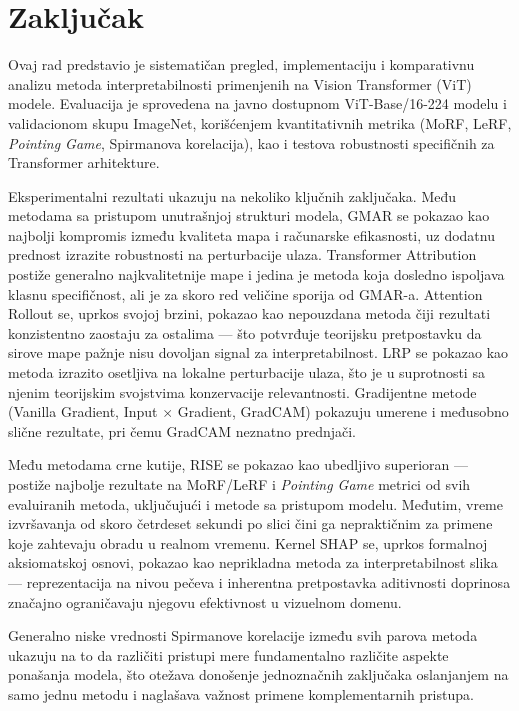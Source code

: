 \section{Zaključak}

Ovaj rad predstavio je sistematičan pregled, implementaciju i komparativnu analizu metoda interpretabilnosti primenjenih na Vision Transformer (ViT) modele. Evaluacija je sprovedena na javno dostupnom ViT-Base/16-224 modelu i validacionom skupu ImageNet, korišćenjem kvantitativnih metrika (MoRF, LeRF, \textit{Pointing Game}, Spirmanova korelacija), kao i testova robustnosti specifičnih za Transformer arhitekture.

Eksperimentalni rezultati ukazuju na nekoliko ključnih zaključaka. Među metodama sa pristupom unutrašnjoj strukturi modela, GMAR se pokazao kao najbolji kompromis između kvaliteta mapa i računarske efikasnosti, uz dodatnu prednost izrazite robustnosti na perturbacije ulaza. Transformer Attribution postiže generalno najkvalitetnije mape i jedina je metoda koja dosledno ispoljava klasnu specifičnost, ali je za skoro red veličine sporija od GMAR-a. Attention Rollout se, uprkos svojoj brzini, pokazao kao nepouzdana metoda čiji rezultati konzistentno zaostaju za ostalima — što potvrđuje teorijsku pretpostavku da sirove mape pažnje nisu dovoljan signal za interpretabilnost. LRP se pokazao kao metoda izrazito osetljiva na lokalne perturbacije ulaza, što je u suprotnosti sa njenim teorijskim svojstvima konzervacije relevantnosti. Gradijentne metode (Vanilla Gradient, Input $\times$ Gradient, GradCAM) pokazuju umerene i međusobno slične rezultate, pri čemu GradCAM neznatno prednjači.

Među metodama crne kutije, RISE se pokazao kao ubedljivo superioran — postiže najbolje rezultate na MoRF/LeRF i \textit{Pointing Game} metrici od svih evaluiranih metoda, uključujući i metode sa pristupom modelu. Međutim, vreme izvršavanja od skoro četrdeset sekundi po slici čini ga nepraktičnim za primene koje zahtevaju obradu u realnom vremenu. Kernel SHAP se, uprkos formalnoj aksiomatskoj osnovi, pokazao kao neprikladna metoda za interpretabilnost slika — reprezentacija na nivou pečeva i inherentna pretpostavka aditivnosti doprinosa značajno ograničavaju njegovu efektivnost u vizuelnom domenu.

Generalno niske vrednosti Spirmanove korelacije između svih parova metoda ukazuju na to da različiti pristupi mere fundamentalno različite aspekte ponašanja modela, što otežava donošenje jednoznačnih zaključaka oslanjanjem na samo jednu metodu i naglašava važnost primene komplementarnih pristupa.

